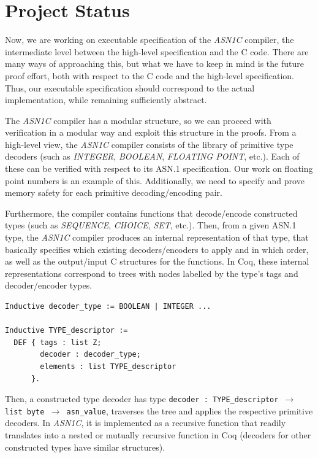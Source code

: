 \documentclass[10p,conference]{IEEEtran}
\begin{document}
\section{Project Status}

Now, we are working on executable specification of the \emph{ASN1C}
compiler, the intermediate level between the high-level specification
and the C code. There are many ways of approaching this, but what we
have to keep in mind is the future proof effort, both with respect to
the C code and the high-level specification. Thus, our executable
specification should correspond to the actual implementation, while remaining
sufficiently abstract.

The \emph{ASN1C} compiler has a modular structure, so we can proceed with
verification in a modular way and exploit this structure in the
proofs. From a high-level view, the \emph{ASN1C} compiler consists of
the library of primitive type decoders (such as \emph{INTEGER}, \emph{BOOLEAN},
\emph{FLOATING POINT}, etc.). Each of these can be verified with respect to its
ASN.1 specification. Our work on floating point numbers is an example
of this. Additionally, we need to specify and prove memory safety
for each primitive decoding/encoding pair.

Furthermore, the compiler contains functions that decode/encode
constructed types (such as \emph{SEQUENCE}, \emph{CHOICE}, \emph{SET}, etc.). Then, from a
given ASN.1 type, the \emph{ASN1C} compiler produces an internal
representation of that type, that basically specifies which existing
decoders/encoders to apply and in which order, as well as the
output/input C structures for the functions. In Coq,
these internal representations correspond to trees with nodes labelled by the
type's tags and decoder/encoder types.

 \begin{lstlisting}[language=Coq]
Inductive decoder_type := BOOLEAN | INTEGER ...

Inductive TYPE_descriptor :=
  DEF { tags : list Z;
        decoder : decoder_type;
        elements : list TYPE_descriptor 
      }.
 \end{lstlisting}

 Then, a constructed type decoder has type \texttt{decoder : TYPE\_descriptor $\rightarrow$ list byte $\rightarrow$ asn\_value}, traverses the tree and applies the respective primitive decoders. In \emph{ASN1C}, it is implemented as
 a recursive function that readily translates into a nested or mutually recursive
 function in Coq (decoders for other constructed types have similar
 structures).
\end{document}
